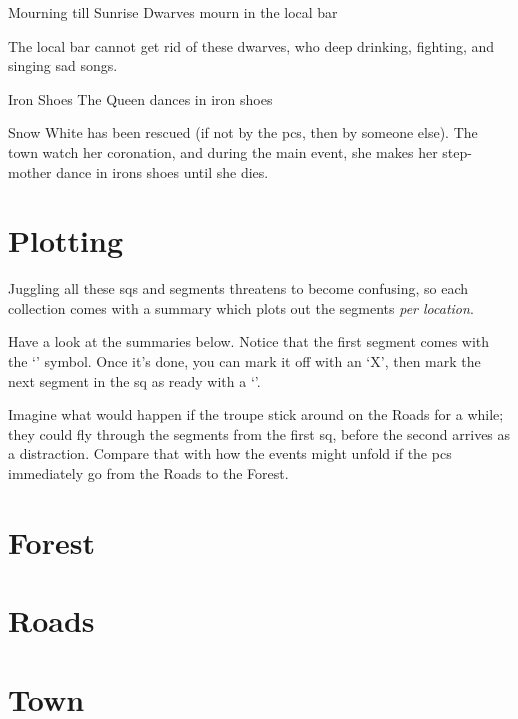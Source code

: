 \begin{multicols}{2}
{Mourning till Sunrise}%
{Dwarves mourn in the local bar}%

The local bar cannot get rid of these dwarves, who deep drinking, fighting, and singing sad songs. 

{Iron Shoes}%
{The Queen dances in iron shoes}%

Snow White has been rescued (if not by the \glspl{pc}, then by someone else).
The town watch her coronation, and during the main event, she makes her step-mother dance in irons shoes until she dies.

\end{multicols}

\section{Plotting }

\begin{multicols}{2}

\noindent
Juggling all these \glspl{sq} and \glspl{segment} threatens to become confusing, so each collection comes with a summary which plots out the \glspl{segment} \emph{per location}.

Have a look at the summaries below.
Notice that the first \gls{segment} comes with the `\sqr' symbol.
Once it's done, you can mark it off with an `X', then mark the next \gls{segment} in the \gls{sq} as ready with a `\sqr'.

Imagine what would happen if the troupe stick around on the Roads for a while; they could fly through the \glspl{segment} from the first \gls{sq}, before the second arrives as a distraction.
Compare that with how the events might unfold if the \glspl{pc} immediately go from the Roads to the Forest.

\end{multicols}

\section*{Forest }

\section*{Roads }

\section*{Town }


